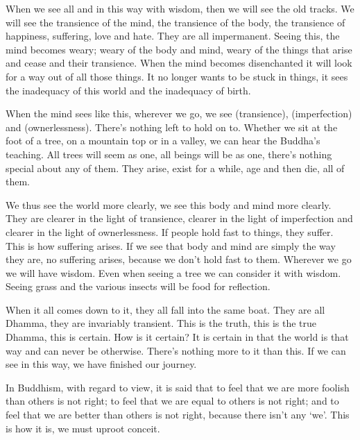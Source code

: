 When we see all  and  in this way with wisdom, then we will see the old tracks. We will see the transience of the mind, the transience of the body, the transience of happiness, suffering, love and hate. They are all impermanent. Seeing this, the mind becomes weary; weary of the body and mind, weary of the things that arise and cease and their transience. When the mind becomes disenchanted it will look for a way out of all those things. It no longer wants to be stuck in things, it sees the inadequacy of this world and the inadequacy of birth. 

When the mind sees like this, wherever we go, we see  (transience),  (imperfection) and  (ownerlessness). There's nothing left to hold on to. Whether we sit at the foot of a tree, on a mountain top or in a valley, we can hear the Buddha's teaching. All trees will seem as one, all beings will be as one, there's nothing special about any of them. They arise, exist for a while, age and then die, all of them. 

We thus see the world more clearly, we see this body and mind more clearly. They are clearer in the light of transience, clearer in the light of imperfection and clearer in the light of ownerlessness. If people hold fast to things, they suffer. This is how suffering arises. If we see that body and mind are simply the way they are, no suffering arises, because we don't hold fast to them. Wherever we go we will have wisdom. Even when seeing a tree we can consider it with wisdom. Seeing grass and the various insects will be food for reflection. 

When it all comes down to it, they all fall into the same boat. They are all Dhamma, they are invariably transient. This is the truth, this is the true Dhamma, this is certain. How is it certain? It is certain in that the world is that way and can never be otherwise. There's nothing more to it than this. If we can see in this way, we have finished our journey. 

In Buddhism, with regard to view, it is said that to feel that we are more foolish than others is not right; to feel that we are equal to others is not right; and to feel that we are better than others is not right, because there isn't any `we'. This is how it is, we must uproot conceit. 

